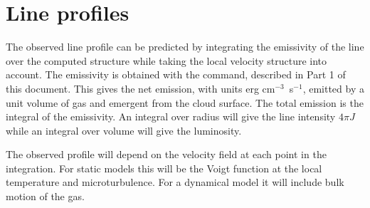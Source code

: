 \section{Line profiles}

The observed line profile can be predicted by integrating the emissivity
of the line over the computed structure while taking the local velocity
structure into account.
The emissivity is obtained with the
 command,
described in Part 1 of this document.
This gives the
net emission, with units erg cm$^{-3}$~s$^{-1}$,
emitted by a unit volume of gas and
emergent from the cloud surface.
The total emission is the integral of
the emissivity.
An integral over radius will give the line intensity $4\pi J$
while an integral over volume will give the luminosity.

The observed profile will depend on the velocity field at each point
in the integration.
For static models this will be the Voigt function at
the local temperature and microturbulence.
For a dynamical model it will
include bulk motion of the gas.


